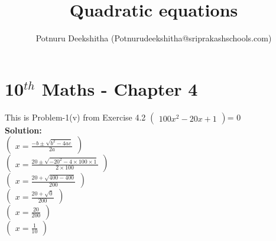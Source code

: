 \documentclass[12pt]{article}
\title{Quadratic equations}
\author{Potnuru Deekshitha (Potnurudeekshitha@sriprakashschools.com)}
\newcommand{\myvec}[1]{\ensuremath{\begin{pmatrix}#1\end{pmatrix}}}
\newcommand{\solution}{\noindent \textbf{Solution: }}
\begin{document}
\section*{10$^{th}$ Maths - Chapter 4}
This is Problem-1(v) from Exercise 4.2
\myvec{{100}x^2-{20} x +{1} }= 0\\

\solution\\
\myvec{x=\frac{-b\pm\sqrt{b^2-4ac}}{2a}}\\
\myvec{x=\frac{20\pm\sqrt{-20^2-4 \times 100\times1}}{2 \times 100}}\\
\myvec{x=\frac{20+\sqrt{400-400}}{200}}\\
\myvec{x=\frac{20+\sqrt{0}}{200}}\\
\myvec{x=\frac{20}{200}}\\
\myvec{x=\frac{1}{10}}\\
\end{document}
